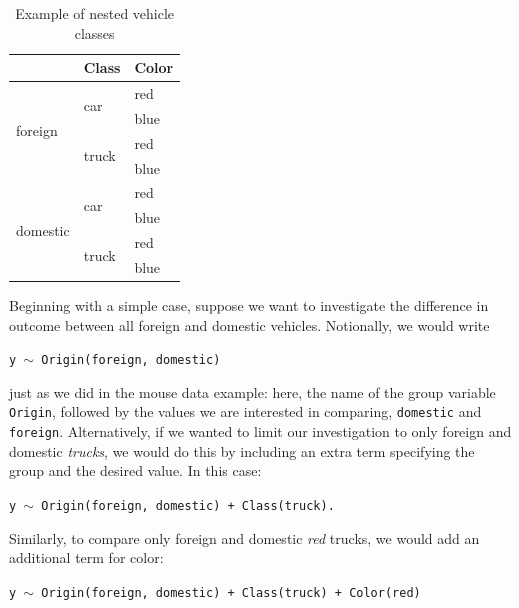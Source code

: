 \documentclass{article}
\newcommand{\xt}{\texttt}%
\begin{document}
\begin{table}[H]
\centering
\def\arraystretch{1.5}
\begin{tabular}{|p{0.9in}|p{0.9in}|p{0.9in}|} \hline 
\rowcolor{lightgray} \multicolumn{1}{|c|}{Origin} & \multicolumn{1}{c|}{Class} & \multicolumn{1}{c|}{Color}\\
\hline
\multirow{4}{*}{foreign} & \multirow{2}{*}{car} & red \\
\hhline{~~-}
& & blue \\
\hhline{~--}
& \multirow{2}{*}{truck} & red \\
\hhline{~~-}
& & blue \\
\hline
\multirow{4}{*}{domestic} & \multirow{2}{*}{car} & red \\
\hhline{~~-}
& & blue \\
\hhline{~--}
& \multirow{2}{*}{truck} & red \\
\hhline{~~-}
& & blue \\
\hline
\end{tabular}
\caption{Example of nested vehicle classes}
\label{tab:vehicle}
\end{table}


Beginning with a simple case, suppose we want to investigate the difference in outcome between all foreign and domestic vehicles. Notionally, we would write
\begin{center}
\tt y $\sim$ Origin(foreign, domestic)
\end{center}
just as we did in the mouse data example: here, the name of the group variable \xt{Origin}, followed by the values we are interested in comparing, \xt{domestic} and \xt{foreign}. Alternatively, if we wanted to limit our investigation to only foreign and domestic \textit{trucks}, we would do this by including an extra term specifying the group and the desired value. In this case:
\begin{center}
\tt y $\sim$ Origin(foreign, domestic) + Class(truck).
\end{center}
Similarly, to compare only foreign and domestic \textit{red} trucks, we would add an additional term for color:
\begin{center}
\tt y $\sim$ Origin(foreign, domestic) + Class(truck) + Color(red)
\end{center}
\end{document}
